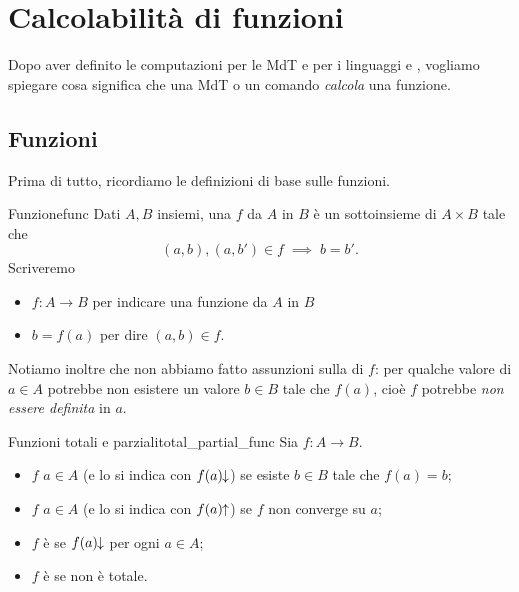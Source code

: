 \section{Calcolabilità di funzioni}

Dopo aver definito le computazioni per le MdT e per i linguaggi  e , vogliamo spiegare cosa significa che una MdT o un comando \emph{calcola} una funzione. 

\subsection*{Funzioni}

Prima di tutto, ricordiamo le definizioni di base sulle funzioni.

\begin{definition}
    {Funzione}{func}
    Dati $A, B$ insiemi, una  $f$ da $A$ in $B$ è un sottoinsieme di $A \times B$ tale che \[
        (a, b), (a, b') \in f \;\implies\; b = b'.
    \] Scriveremo \begin{itemize}
        \item $f : A \to B$ per indicare una funzione da $A$ in $B$
        \item $b = f(a)$ per dire $(a, b) \in f$.
    \end{itemize}
\end{definition}

 Notiamo inoltre che non abbiamo fatto assunzioni sulla  di $f$: per qualche valore di $a \in A$ potrebbe non esistere un valore $b \in B$ tale che $f(a)$, cioè $f$ potrebbe \emph{non essere definita} in $a$.

\begin{definition}
    {Funzioni totali e parziali}{total_partial_func}
    Sia $f : A \to B$. \begin{itemize}
        \item $f$  $a \in A$ (e lo si indica con $f(a)\!\!\downarrow$) se esiste $b \in B$ tale che $f(a) = b$;
        \item $f$  $a \in A$ (e lo si indica con $f(a)\!\!\uparrow$) se $f$ non converge su $a$;
        \item $f$ è  se $f(a)\!\!\downarrow$ per ogni $a \in A$;
        \item $f$ è  se non è totale.     
    \end{itemize}   
\end{definition}


